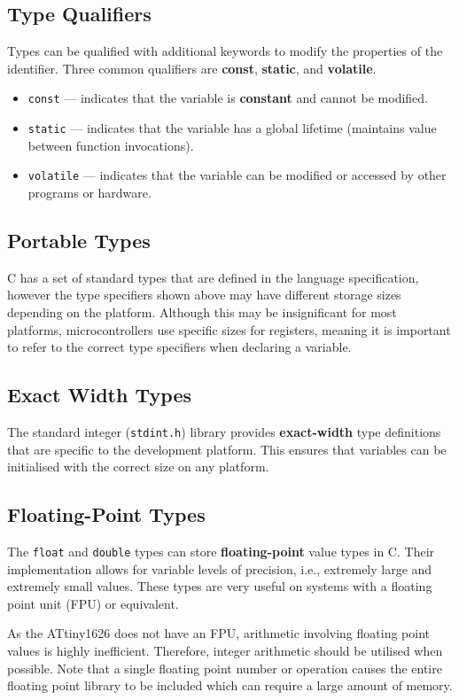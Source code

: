 \documentclass[a4paper]{report}
\begin{document}
\subsection{Type Qualifiers}
Types can be qualified with additional keywords to modify the properties of
the identifier. Three common qualifiers are \textbf{const}, \textbf{static}, and \textbf{volatile}.
\begin{itemize}
    \item \texttt{const} --- indicates that the variable is \textbf{constant} and cannot be modified.
    \item \texttt{static} --- indicates that the variable has a global lifetime (maintains value between function invocations).
    \item \texttt{volatile} --- indicates that the variable can be modified or accessed by other programs or hardware.
\end{itemize}
\subsection{Portable Types}
C has a set of standard types that are defined in the language specification,
however the type specifiers shown above may have different storage sizes depending on the platform.
Although this may be insignificant for most platforms, microcontrollers
use specific sizes for registers, meaning it is important to refer to the correct
type specifiers when declaring a variable.
\subsection{Exact Width Types}\label{sec:exact_width_types}
The standard integer (\texttt{stdint.h}) library provides \textbf{exact-width} type definitions that are specific to
the development platform. This ensures that variables can be initialised with the correct size on any platform.
\subsection{Floating-Point Types}
The \texttt{float} and \texttt{double} types can store \textbf{floating-point} value types in C.
Their implementation allows for variable levels of precision, i.e., extremely large and extremely small values.
These types are very useful on systems with a floating point unit (FPU) or equivalent.

As the ATtiny1626 does not have an FPU, arithmetic involving floating point values is highly inefficient. Therefore,
integer arithmetic should be utilised when possible. Note that a single floating point number or operation causes
the entire floating point library to be included which can require a large amount of memory.
\end{document}

